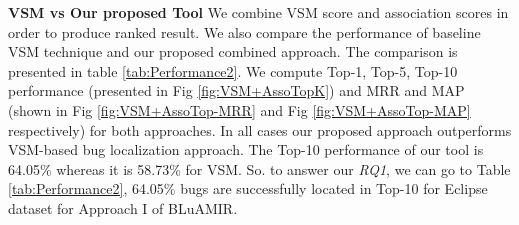 \documentclass[conference]{IEEEtran}
\begin{document}
\textbf{VSM vs Our proposed Tool}
We combine VSM score and association scores in order to produce ranked result. We also compare the performance of baseline VSM technique and our proposed combined approach. The comparison is presented in table \ref{tab:Performance2}. We compute Top-1, Top-5, Top-10 performance (presented in Fig \ref{fig:VSM+AssoTopK}) and MRR and MAP (shown in Fig \ref{fig:VSM+AssoTop-MRR} and Fig \ref{fig:VSM+AssoTop-MAP} respectively) for both approaches. In all cases our proposed approach outperforms VSM-based bug localization approach. The Top-10 performance of our tool is 64.05\% whereas it is 58.73\% for VSM.
So. to answer our \textit{RQ1}, we can go to Table \ref{tab:Performance2}, 64.05\% bugs are successfully located in Top-10 for Eclipse dataset for Approach I of BLuAMIR. 
\begin{table}[htbp]
	\centering
	\caption{Performance of proposed technique (VSM+Association) Ranks}
	\label{tab:Performance2}
\end{table}
\end{document}
